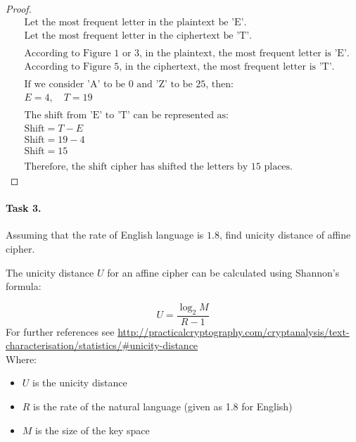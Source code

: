 \documentclass{article}
\begin{document}
\begin{enumerate}
\begin{minipage}{\linewidth}
\begin{proof}
\begin{align*}
              &\text{Let the most frequent letter in the plaintext be 'E'.} \\
              &\text{Let the most frequent letter in the ciphertext be 'T'.} \\
              & \\
              &\text{According to Figure 1 or 3, in the plaintext, the most frequent letter is 'E'.} \\
              &\text{According to Figure 5, in the ciphertext, the most frequent letter is 'T'.} \\
              & \\
              &\text{If we consider 'A' to be 0 and 'Z' to be 25, then:} \\
              &E = 4, \quad T = 19 \\
              & \\
              &\text{The shift from 'E' to 'T' can be represented as:} \\
              &\text{Shift} = T - E \\
              &\text{Shift} = 19 - 4 \\
              &\text{Shift} = 15 \\
              & \\
              &\text{Therefore, the shift cipher has shifted the letters by 15 places.}
            \end{align*}
          \end{proof}
    \end{minipage}
\end{enumerate}


\paragraph{Task 3.} Assuming that the rate of English language is $1.8$, find unicity distance of affine cipher.


The unicity distance \( U \) for an affine cipher can be calculated using Shannon's formula:

\[
  U = \frac{\log_2 M}{R - 1}
\]
For further references see \href{http://practicalcryptography.com/cryptanalysis/text-characterisation/statistics/#unicity-distance}{http://practicalcryptography.com/cryptanalysis/text-characterisation/statistics/#unicity-distance}\\

Where:
\begin{itemize}
  \item \( U \) is the unicity distance
  \item \( R \) is the rate of the natural language (given as 1.8 for English)
  \item \( M \) is the size of the key space
\end{itemize}
\end{document}
